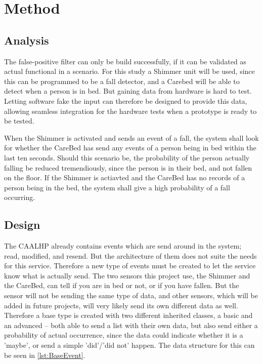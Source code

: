 \section{Method}


\subsection{Analysis}

The false-positive filter can only be build successfully, if it can be validated as actual functional in a scenario.
For this study a Shimmer unit\cite{Shimmer} will be used, since this can be programmed to be a fall detector, and a Carebed will be able to detect when a person is in bed.
But gaining data from hardware is hard to test. 
Letting software fake the input can therefore be designed to provide this data, allowing seamless integration for the hardware tests when a prototype is ready to be tested.

When the Shimmer is activated and sends an event of a fall, the system shall look for whether the CareBed has send any events of a person being in bed within the last ten seconds.
Should this scenario be, the probability of the person actually falling be reduced tremendiously, since the person is in their bed, and not fallen on the floor.
If the Shimmer is actiavted and the CareBed has no records of a person being in the bed, the system shall give a high probability of a fall occurring.

\subsection{Design}

The CAALHP already contains events which are send around in the system; read, modified, and resend.
But the architecture of them does not suite the needs for this service.
Therefore a new type of events must be created to let the service know what is actually send.
The two sensors this project use, the Shimmer and the CareBed, can tell if you are in bed or not, or if you have fallen.
But the sensor will not be sending the same type of data, and other sensors, which will be added in future projects, will very likely send its own different data as well.
Therefore a base type is created with two different inherited classes, a basic and an advanced -- both able to send a list with their own data, but also send either a probability of actual occurrence, since the data could indicate whether it is a 'maybe', or send a simple 'did'/'did not' happen.
The data structure for this can be seen in \codeTitle \ref{lst:BaseEvent}.

